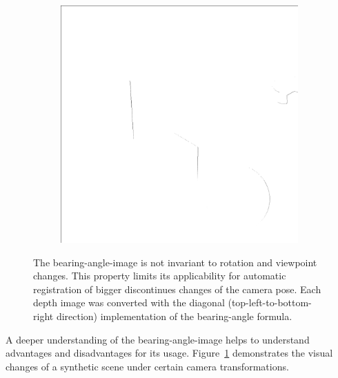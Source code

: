 \begin{figure}[H]
\begin{subfigure}[t]{0.32\textwidth}
    \end{subfigure}
    \begin{subfigure}[t]{0.32\textwidth}
        \includegraphics[width=\linewidth]{chapter04/img/bearing-diag-0210.png}
    \end{subfigure}
    \caption[Bearing Angle Image Characteristics demonstrated]{The \gls{bearing-angle-image} is not invariant to rotation and viewpoint changes. This property limits its applicability for automatic registration of bigger discontinues changes of the camera pose. Each depth image was converted with the diagonal (top-left-to-bottom-right direction) implementation of the \gls{bearing-angle} formula.}\label{fig:bearing_characteristics}
\end{figure}
A deeper understanding of the \gls{bearing-angle-image} helps to understand advantages and disadvantages for its usage.
Figure~\ref{fig:bearing_characteristics} demonstrates the visual changes of a synthetic scene under certain camera transformations.

